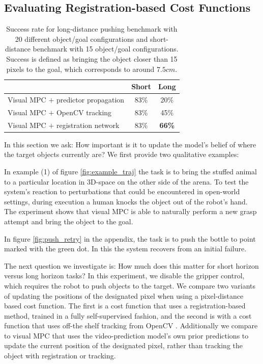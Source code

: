 \subsection{Evaluating Registration-based Cost Functions}
\label{susbsec:reg_cost_exp}

\begin{table}
	{\footnotesize
		\begin{center}
			\begin{tabular}{lcc}
				\toprule
				& Short & Long \\
				\midrule
				Visual MPC $+$ predictor propagation  & 83\% & 20\% \\
				Visual MPC $+$ OpenCV tracking  & 83\%  & 45\% \\
				Visual MPC $+$ registration network & 83\% & \textbf{66\%}  \\
				\bottomrule
			\end{tabular}
		\end{center}
	}
	\caption{\small Success rate for long-distance pushing benchmark with 20 different object/goal configurations and short-distance benchmark with 15 object/goal configurations. Success is defined as bringing the object closer than 15 pixels to the goal, which corresponds to around $7.5cm$.}
	\label{table:res_long_short}
\end{table}
In this section we ask: How important  is it to update the model's belief of where the target objects currently are? 
We first provide two qualitative examples:

In example (1) of figure \ref{fig:example_traj} the task is to bring the stuffed animal to a particular location in 3D-space on the other side of the arena. To test the system's reaction to perturbations that could be encountered in open-world settings, during execution a human knocks the object out of the robot's hand. The experiment shows that visual MPC is able to naturally perform a new grasp attempt and bring the object to the goal.

In figure \ref{fig:push_retry} in the appendix, the task is to push the bottle to point marked with the green dot. In this the system recovers from an initial failure.

The next question we investigate is: How much does this matter for short horizon versus long horizon tasks? 
In this experiment, we disable the gripper control, which requires the robot to push objects to the target. We compare two variants of updating the positions of the designated pixel when using a pixel-distance based cost function. The first is a cost function that uses a registration-based method, trained in a fully self-supervised fashion, and the second is with a cost function that uses off-the shelf tracking from OpenCV \cite{babenko2009visual}. Additionally we compare to visual MPC that uses the video-prediction model's own prior predictions to update the current position of the designated pixel, rather than tracking the object with registration or tracking.

